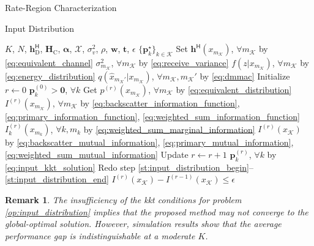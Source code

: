 \documentclass[journal]{IEEEtran}
\newtheorem{remark}{Remark}
\begin{document}
\begin{section}{Rate-Region Characterization}
\begin{subsection}{Input Distribution}
		\begin{algorithm}[!t]
			\caption{\gls{kkt} Input Distribution Evaluation by Limits of Sequence}
			\label{al:input_distribution}
			\begin{algorithmic}[1]
				\Require $K$, $N$, $\boldsymbol{h}_{\text{D}}^\mathsf{H}$, $\boldsymbol{H}_{\text{C}}$, $\boldsymbol{\alpha}$, $\mathcal{X}$, $\sigma_v^2$, $\rho$, $\boldsymbol{w}$, $\boldsymbol{t}$, $\epsilon$
				\Ensure $\{\boldsymbol{p}_k^\star\}_{k \in \mathcal{K}}$
				\State Set $\boldsymbol{h}^\mathsf{H}(x_{m_{\mathcal{K}}})$, $\forall m_{\mathcal{K}}$ by \eqref{eq:equivalent_channel}
				\State \phantom{Set} $\sigma^2_{m_{\mathcal{K}}}$, $\forall m_{\mathcal{K}}$ by \eqref{eq:receive_variance}
				\State \phantom{Set} $f(z|x_{m_{\mathcal{K}}})$, $\forall m_{\mathcal{K}}$ by \eqref{eq:energy_distribution}
				\State \phantom{Set} $q(\hat{x}_{m_{\mathcal{K}}'}|x_{m_{\mathcal{K}}})$, $\forall m_{\mathcal{K}}, m_{\mathcal{K}}'$ by \eqref{eq:dmmac}
				\State Initialize $r \gets 0$
				\State \phantom{Initialize} $\boldsymbol{p}_k^{(0)} > \boldsymbol{0}$, $\forall k$
				\State Get $p^{(r)}(x_{m_{\mathcal{K}}})$, $\forall m_{\mathcal{K}}$ by \eqref{eq:equivalent_distribution} \label{st:input_distribution_begin}
				\State \phantom{Get} $I^{(r)}(x_{m_{\mathcal{K}}})$, $\forall m_{\mathcal{K}}$ by \eqref{eq:backscatter_information_function}, \eqref{eq:primary_information_function}, \eqref{eq:weighted_sum_information_function}
				\State \phantom{Get} $I^{(r)}_k(x_{m_k})$, $\forall k,m_k$ by \eqref{eq:weighted_sum_marginal_information}
				\State \phantom{Get} $I^{(r)}(x_{\mathcal{K}})$ by \eqref{eq:backscatter_mutual_information}, \eqref{eq:primary_mutual_information}, \eqref{eq:weighted_sum_mutual_information} \label{st:input_distribution_end}
				\Repeat
					\State Update $r \gets r+1$
					\State \phantom{Update} $\boldsymbol{p}_k^{(r)}$, $\forall k$ by \eqref{eq:input_kkt_solution}
					\State Redo step \ref{st:input_distribution_begin}--\ref{st:input_distribution_end}
				\Until $I^{(r)}(x_{\mathcal{K}}) - I^{(r-1)}(x_{\mathcal{K}}) \le \epsilon$
			\end{algorithmic}
		\end{algorithm}

		\begin{remark}
			The insufficiency of the \gls{kkt} conditions for problem \eqref{op:input_distribution} implies that the proposed method may not converge to the global-optimal solution.
			However, simulation results show that the average performance gap is indistinguishable at a moderate $K$.
			\label{re:input_kkt_distribution}
		\end{remark}
	\end{subsection}


\end{section}
\end{document}

